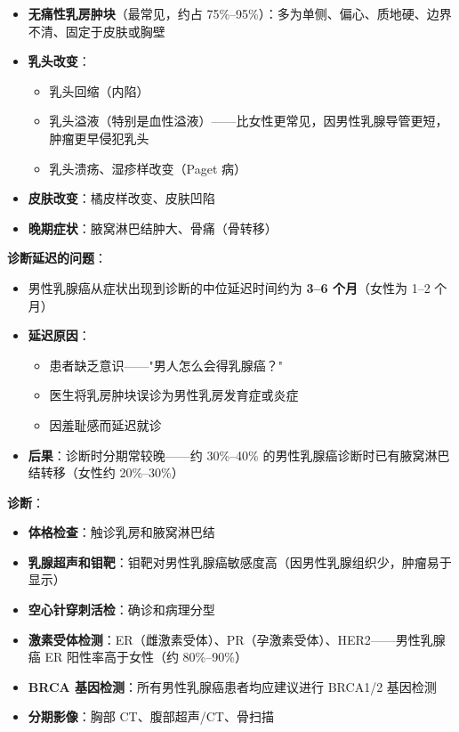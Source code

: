 \begin{itemize}[leftmargin=2cm]
	\item \textbf{无痛性乳房肿块}（最常见，约占 75\%--95\%）：多为单侧、偏心、质地硬、边界不清、固定于皮肤或胸壁
	\item \textbf{乳头改变}：
	\begin{itemize}
		\item 乳头回缩（内陷）
		\item 乳头溢液（特别是血性溢液）——比女性更常见，因男性乳腺导管更短，肿瘤更早侵犯乳头
		\item 乳头溃疡、湿疹样改变（Paget 病）
	\end{itemize}
	\item \textbf{皮肤改变}：橘皮样改变、皮肤凹陷
	\item \textbf{晚期症状}：腋窝淋巴结肿大、骨痛（骨转移）
\end{itemize}

\vspace{0.5em}
\noindent\textbf{诊断延迟的问题}：

\begin{itemize}[leftmargin=2cm]
	\item 男性乳腺癌从症状出现到诊断的中位延迟时间约为 \textbf{3--6 个月}（女性为 1--2 个月）
	\item \textbf{延迟原因}：
	\begin{itemize}
		\item 患者缺乏意识——"男人怎么会得乳腺癌？"
		\item 医生将乳房肿块误诊为男性乳房发育症或炎症
		\item 因羞耻感而延迟就诊
	\end{itemize}
	\item \textbf{后果}：诊断时分期常较晚——约 30\%--40\% 的男性乳腺癌诊断时已有腋窝淋巴结转移（女性约 20\%--30\%）
\end{itemize}

\vspace{0.5em}
\noindent\textbf{诊断}：

\begin{itemize}[leftmargin=2cm]
	\item \textbf{体格检查}：触诊乳房和腋窝淋巴结
	\item \textbf{乳腺超声和钼靶}：钼靶对男性乳腺癌敏感度高（因男性乳腺组织少，肿瘤易于显示）
	\item \textbf{空心针穿刺活检}：确诊和病理分型
	\item \textbf{激素受体检测}：ER（雌激素受体）、PR（孕激素受体）、HER2——男性乳腺癌 ER 阳性率高于女性（约 80\%--90\%）
	\item \textbf{BRCA 基因检测}：所有男性乳腺癌患者均应建议进行 BRCA1/2 基因检测
	\item \textbf{分期影像}：胸部 CT、腹部超声/CT、骨扫描
\end{itemize}

